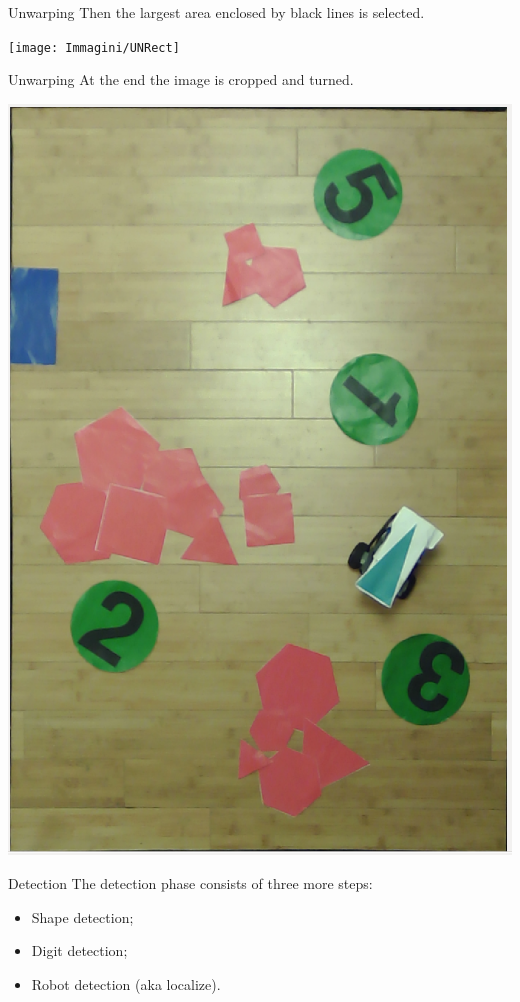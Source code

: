\begin{frame}[fragile]{Unwarping}
	Then the largest area enclosed by black lines is selected. 
	\begin{center}
		\texttt{[image: Immagini/UNRect]}
	\end{center}
\end{frame}

\begin{frame}[fragile]{Unwarping}
	At the end the image is cropped and turned. 
	\begin{center}
		\includegraphics[scale=0.18]{Immagini/Unwrapped.png}
	\end{center}
\end{frame}


\begin{frame}[fragile]{Detection}
	The detection phase consists of three more steps:
	\begin{itemize}
		\item Shape detection;
		\item Digit detection;
		\item Robot detection (aka localize).
	\end{itemize}
\end{frame}

